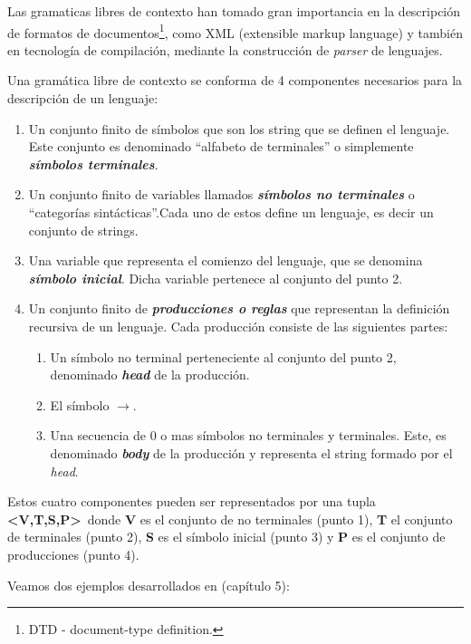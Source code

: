 Las gramaticas libres de contexto han tomado gran importancia en la descripción de formatos de documentos\footnote{ DTD - document-type definition.}, como XML (extensible markup language) y también en tecnología de compilación, mediante la construcción de \textit{parser} de lenguajes.  
\begin{definition}
Una gramática libre de contexto se conforma de 4 componentes necesarios para la descripción de un lenguaje:
\begin{enumerate}
\item Un conjunto finito de símbolos que son los string que se definen el lenguaje. Este conjunto es denominado ``alfabeto de terminales'' o simplemente \textit{\textbf{símbolos terminales}}.

\item Un conjunto finito de variables llamados \textit{\textbf{símbolos no terminales}} o ``categorías sintácticas''.Cada uno de estos define un lenguaje, es decir un conjunto de strings.

\item Una variable que representa el comienzo del lenguaje, que se denomina \textit{\textbf{símbolo inicial}}. Dicha variable pertenece al conjunto del punto 2.

\item Un conjunto finito de \textit{\textbf{producciones o reglas}} que representan la definición recursiva de un lenguaje. Cada producción consiste de las siguientes partes:

\begin{enumerate}
\item Un símbolo no terminal perteneciente al conjunto del punto 2, denominado \textit{\textbf{head}} de la producción.

\item El símbolo \textbf{$\rightarrow$}.

\item Una secuencia de 0 o mas símbolos no terminales y terminales. Este, es denominado \textit{\textbf{body}} de la producción y representa el string formado por el \textit{head}.
\end{enumerate}

\end{enumerate}

Estos cuatro componentes pueden ser representados por una tupla \textbf{<V,T,S,P>}\ donde \textbf{V} es el conjunto de no terminales (punto 1), \textbf{T} el conjunto de terminales (punto 2), \textbf{S} es el símbolo inicial (punto 3) y \textbf{P} es el conjunto de producciones (punto 4).
\end{definition}
Veamos dos ejemplos desarrollados en \cite{gramatica} (capítulo 5):

